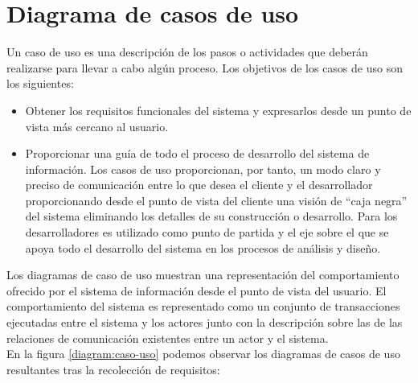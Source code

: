 \section {Diagrama de casos de uso}

Un caso de uso es una descripción de los pasos o actividades que deberán realizarse para llevar a cabo algún proceso. Los objetivos de los casos de uso son los siguientes:

\begin{itemize}
\item Obtener los requisitos funcionales del sistema y expresarlos desde un punto de vista más cercano al usuario.
\item Proporcionar una guía de todo el proceso de desarrollo del sistema de información. Los casos de uso proporcionan, por tanto, un modo claro y preciso de comunicación entre lo que desea el cliente y el desarrollador proporcionando desde el punto de vista del cliente una visión de ``caja negra'' del sistema eliminando los detalles de su construcción o desarrollo. Para los desarrolladores es utilizado como punto de partida y el eje sobre el que se apoya todo el desarrollo del sistema en los procesos de análisis y diseño.
\end{itemize}

Los diagramas de caso de uso muestran una representación del comportamiento ofrecido por el sistema de información desde el punto de vista del usuario. El comportamiento
del sistema es representado como un conjunto de transacciones ejecutadas entre el sistema y los actores junto con la descripción sobre las de las relaciones de comunicación
existentes entre un actor y el sistema.\\

En la figura \ref{diagram:caso-uso} podemos observar los diagramas de casos de uso resultantes tras la recolección de requisitos:

